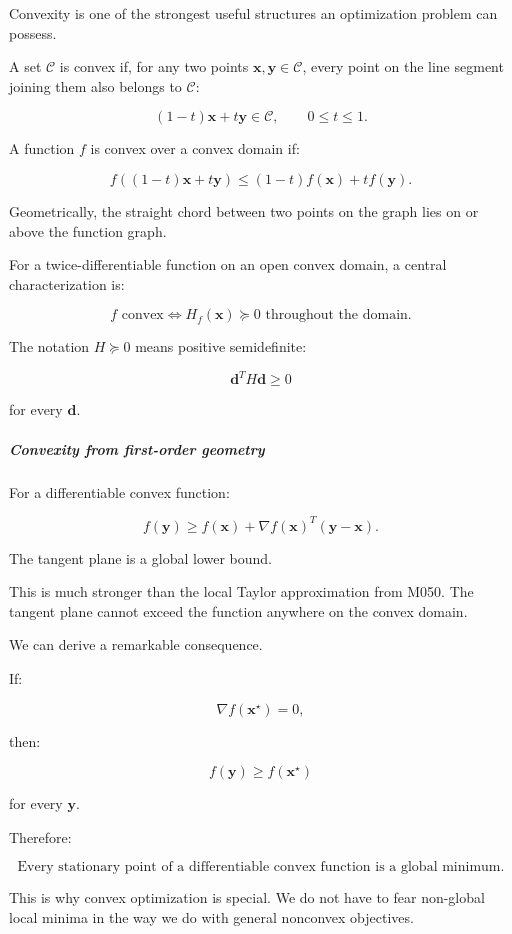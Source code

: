 Convexity is one of the strongest useful structures an optimization problem can possess.

A set \(\mathcal C\) is convex if, for any two points \(\mathbf x,\mathbf y\in\mathcal C\), every point on the line segment joining them also belongs to \(\mathcal C\):

\[
(1-t)\mathbf x+t\mathbf y\in\mathcal C, \qquad 0\le t\le1.
\]

A function \(f\) is convex over a convex domain if:

\[
\boxed{ f((1-t)\mathbf x+t\mathbf y) \le (1-t)f(\mathbf x)+tf(\mathbf y) }.
\]

Geometrically, the straight chord between two points on the graph lies on or above the function graph.

For a twice-differentiable function on an open convex domain, a central characterization is:

\[
\boxed{ f\text{ convex} \iff H_f(\mathbf x)\succeq0 \text{ throughout the domain} }.
\]

The notation \(H\succeq0\) means positive semidefinite:

\[
\mathbf d^TH\mathbf d\ge0
\]

for every \(\mathbf d\).

\subparagraph{Convexity from first-order geometry}\label{convexity-from-first-order-geometry}

For a differentiable convex function:

\[
\boxed{ f(\mathbf y)\ge f(\mathbf x)+ \nabla f(\mathbf x)^T(\mathbf y-\mathbf x) }.
\]

The tangent plane is a global lower bound.

This is much stronger than the local Taylor approximation from M050. The tangent plane cannot exceed the function anywhere on the convex domain.

We can derive a remarkable consequence.

If:

\[
\nabla f(\mathbf x^\star)=0,
\]

then:

\[
f(\mathbf y)\ge f(\mathbf x^\star)
\]

for every \(\mathbf y\).

Therefore:

\[
\boxed{ \text{Every stationary point of a differentiable convex function is a global minimum.} }
\]

This is why convex optimization is special. We do not have to fear non-global local minima in the way we do with general nonconvex objectives.

